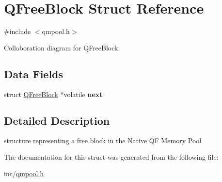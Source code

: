 \hypertarget{structQFreeBlock}{}\section{Q\+Free\+Block Struct Reference}
\label{structQFreeBlock}


{\ttfamily \#include $<$qmpool.\+h$>$}



Collaboration diagram for Q\+Free\+Block\+:
\subsection*{Data Fields}
\begin{DoxyCompactItemize}
\item 
struct \hyperlink{structQFreeBlock}{Q\+Free\+Block} $\ast$volatile {\bfseries next}\hypertarget{structQFreeBlock_a4b01e35c2231fa79db9bc16cd5bba9a4}{}\label{structQFreeBlock_a4b01e35c2231fa79db9bc16cd5bba9a4}

\end{DoxyCompactItemize}


\subsection{Detailed Description}
structure representing a free block in the Native QF Memory Pool 

The documentation for this struct was generated from the following file\+:\begin{DoxyCompactItemize}
\item 
inc/\hyperlink{qmpool_8h}{qmpool.\+h}\end{DoxyCompactItemize}
